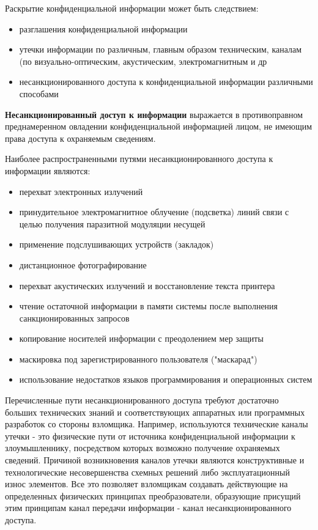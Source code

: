 Раскрытие конфиденциальной информации может быть следствием:
\begin{itemize}
    \item разглашения конфиденциальной информации
    \item утечки информации по различным, главным образом техническим, каналам
        (по визуально-оптическим, акустическим, электромагнитным и др
    \item несанкционированного доступа к конфиденциальной информации различными способами
\end{itemize}

\textbf{Несанкционированный доступ к информации} выражается в противоправном преднамеренном
овладении конфиденциальной информацией лицом, не имеющим права доступа к охраняемым сведениям.

Наиболее распространенными путями несанкционированного доступа к информации являются:
\begin{itemize}
    \item перехват электронных излучений
    \item принудительное электромагнитное облучение (подсветка) линий связи с целью получения
        паразитной модуляции несущей
    \item применение подслушивающих устройств (закладок)
    \item дистанционное фотографирование
    \item перехват акустических излучений и восстановление текста принтера
    \item чтение остаточной информации в памяти системы после выполнения санкционированных запросов
    \item копирование носителей информации с преодолением мер защиты
    \item маскировка под зарегистрированного пользователя ("маскарад")
    \item использование недостатков языков программирования и операционных систем
\end{itemize}

Перечисленные пути несанкционированного доступа требуют достаточно больших технических знаний и
соответствующих аппаратных или программных разработок со стороны взломщика. Например, используются
технические каналы утечки - это физические пути от источника конфиденциальной информации к
злоумышленнику, посредством которых возможно получение охраняемых сведений. Причиной возникновения
каналов утечки являются конструктивные и технологические несовершенства схемных решений либо
эксплуатационный износ элементов. Все это позволяет взломщикам создавать действующие на определенных
физических принципах преобразователи, образующие присущий этим принципам канал передачи информации
- канал несанкционированного доступа.

